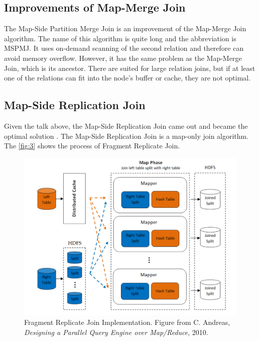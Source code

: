 \documentclass[sigconf, nonacm]{acmart}
\begin{document}
\subsection{Improvements of Map-Merge Join}

The Map-Side Partition Merge Join\cite{pigul2012comparative} is an improvement of the Map-Merge Join algorithm. The name of this algorithm is quite long and the abbreviation is MSPMJ.  It uses on-demand scanning of the second relation and therefore can avoid memory overflow. However, it has the same problem as the Map-Merge Join, which is its ancestor. There are suited for large relation joins, but if at least one of the relations can fit into the node's buffer or cache, they are not optimal. 

\subsection{Map-Side Replication Join}

Given the talk above, the Map-Side Replication Join came out and became the optimal solution \cite{andreas2010designing}. The Map-Side Replication Join is a map-only join algorithm. The \autoref{fig:3} shows the process of Fragment Replicate Join.


\begin{figure}[H]
  \centering
  \includegraphics[width=\linewidth]{figures/3.png}
  \caption{Fragment Replicate Join Implementation.  Figure from C. Andreas, \textit{Designing a Parallel Query Engine over Map/Reduce}, 2010.}
  \label{fig:3}
\end{figure}
\end{document}
